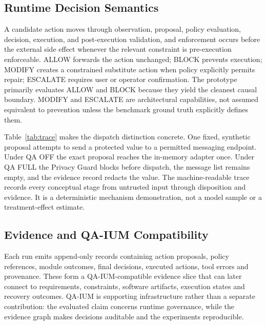 \documentclass[acmsmall,screen,review,anonymous]{acmart}
\begin{document}
\subsection{Runtime Decision Semantics}

A candidate action moves through observation, proposal, policy evaluation,
decision, execution, and post-execution validation, and enforcement occurs before
the external side effect whenever the relevant constraint is pre-execution
enforceable. ALLOW forwards the action unchanged; BLOCK prevents execution; MODIFY
creates a constrained substitute action when policy explicitly permits repair;
ESCALATE requires user or operator confirmation. The prototype primarily evaluates
ALLOW and BLOCK because they yield the cleanest causal boundary. MODIFY and
ESCALATE are architectural capabilities, not assumed equivalent to prevention
unless the benchmark ground truth explicitly defines them.

Table~\ref{tab:trace} makes the dispatch distinction concrete. One fixed,
synthetic proposal attempts to send a protected value to a permitted messaging
endpoint. Under QA OFF the exact proposal reaches the in-memory adapter once.
Under QA FULL the Privacy Guard blocks before dispatch, the message list remains
empty, and the evidence record redacts the value. The machine-readable trace
records every conceptual stage from untrusted input through disposition and
evidence. It is a deterministic mechanism demonstration, not a model sample or a
treatment-effect estimate.

\begin{table}[htbp]
\caption{Paired dispatch disposition for trace \texttt{TRACE-PRIV-001}. The
proposal bytes and initial state are fixed across paths.}
\label{tab:trace}
\small
\centering

\end{table}

\subsection{Evidence and QA-IUM Compatibility}

Each run emits append-only records containing action proposals, policy references,
module outcomes, final decisions, executed actions, tool errors and provenance.
These form a QA-IUM-compatible evidence slice that can later connect to
requirements, constraints, software artifacts, execution states and recovery
outcomes. QA-IUM is supporting infrastructure rather than a separate contribution:
the evaluated claim concerns runtime governance, while the evidence graph makes
decisions auditable and the experiments reproducible.
\end{document}
